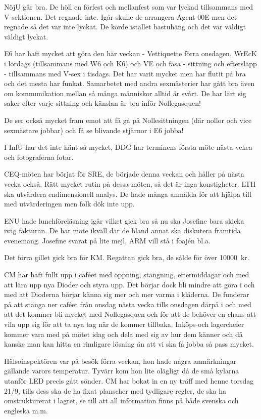 \documentclass[10pt]{article}
\begin{document}
\begin{paragrafer}
\begin{paragrafer}
NöjU går bra. De höll en förfest och mellanfest som var lyckad tillsammans med V-sektionen. Det regnade inte. Igår skulle de arrangera Agent 00E men det regnade så det var inte lyckat. De körde istället bastuhäng och det var väldigt väldigt lyckat.

E6 har haft mycket att göra den här veckan - Vettiquette förra onsdagen, WrEcK i lördags (tillsammans med W6 och K6) och VE och fasa - sittning och eftersläpp - tillsammans med V-sex i tisdags. Det har varit mycket men har flutit på bra och det mesta har funkat. Samarbetet med andra sexmästerier har gått bra även om kommunikation mellan så många människor alltid är svårt. De har lärt sig saker efter varje sittning och känslan är bra inför Nollegasquen!

De ser också mycket fram emot att få gå på Nollesittningen (där nollor och vice sexmästare jobbar) och få se blivande stjärnor i E6 jobba!

I InfU har det inte hänt så mycket, DDG har terminens första möte nästa vekca och fotograferna fotar.

CEQ-möten har börjat för SRE, de började denna veckan och håller på nästa vecka också. Rätt mycket rutin på dessa möten, så det är inga konstigheter. LTH ska utvärdera endimensionell analys. De hade många anmälda för att hjälpa till med utvärderingen men folk dök inte upp.

ENU hade lunchföreläsning igår vilket gick bra så nu ska Josefine bara skicka iväg fakturan. De har möte ikväll där de bland annat ska diskutera framtida evenemang. Josefine svarat på lite mejl, ARM vill stå i foajén bl.a.

Det förra gillet gick bra för KM. Regattan gick bra, de sålde för över \SI{10000}{kr}.

CM har haft fullt upp i caféet med öppning, stängning, eftermiddagar och med att lära upp nya Dioder och styra upp. Det börjar dock bli mindre att göra i och med att Dioderna börjar känna sig mer och mer varma i kläderna. De funderar på att stänga ner caféet från onsdag nästa vecka tills onsdagen därpå i och med att det kommer bli mycket med Nollegasquen och för att de behöver en chans att vila upp sig för att ta nya tag när de kommer tillbaka. Inköps-och lagerchefer kommer vara med på mötet idag och dela med sig av hur dem känner och då kanske man kan hitta en rimligare lösning än att vi ska få jobba så pass mycket.

Hälsoinspektören var på besök förra veckan, hon hade några anmärkningar gällande varors temperatur. Tyvärr kom hon lite olägligt då de små kylarna utanför LED precis gått sönder. CM har bokat in en ny träff med henne torsdag 21/9, tills dess ska de ha fixat planscher med tydligare regler, de ska ha omstrukturerat i lagret, se till att all information finns på både svenska och engleska m.m.


\end{paragrafer}
\end{paragrafer}
\end{document}
